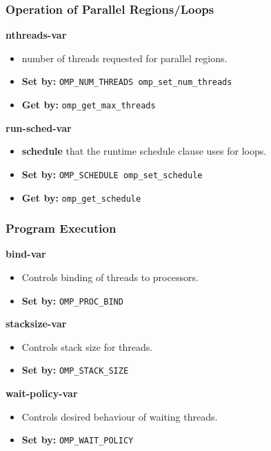 \documentclass[aspectratio=43]{beamer}
\newenvironment{changemargin}[1]{%
  \begin{list}{}{%
    \setlength{\topsep}{0pt}%
    \setlength{\leftmargin}{#1}%
    \setlength{\rightmargin}{1em}
    \setlength{\listparindent}{\parindent}%
    \setlength{\itemindent}{\parindent}%
    \setlength{\parsep}{\parskip}%
  }%
  \item[]}{\end{list}}
\begin{document}
\begin{frame}
  \frametitle{Operation of Parallel Regions/Loops}

  \begin{changemargin}{1.5cm}
  {\bf nthreads-var}
  \begin{itemize}
    \item number of threads requested for parallel regions.
    \item {\bf Set by:} {\tt OMP\_NUM\_THREADS omp\_set\_num\_threads}
    \item {\bf Get by:} {\tt omp\_get\_max\_threads}
  \end{itemize}
  \vfill
  {\bf run-sched-var}
  \begin{itemize}
    \item {\bf schedule} that the runtime schedule clause uses for loops.
    \item {\bf Set by:} {\tt OMP\_SCHEDULE omp\_set\_schedule}
    \item {\bf Get by:} {\tt omp\_get\_schedule}
  \end{itemize}
  \end{changemargin}

\end{frame}

\begin{frame}
  \frametitle{Program Execution}

  \begin{changemargin}{1.5cm}
  {\bf bind-var}
  \begin{itemize}
    \item Controls binding of threads to processors.
    \item {\bf Set by:} {\tt OMP\_PROC\_BIND}
  \end{itemize}
  \vfill
  {\bf stacksize-var}
  \begin{itemize}
    \item Controls stack size for threads.
    \item {\bf Set by:} {\tt OMP\_STACK\_SIZE}
  \end{itemize}
  \vfill
  {\bf wait-policy-var}
  \begin{itemize}
    \item Controls desired behaviour of waiting threads.
    \item {\bf Set by:} {\tt OMP\_WAIT\_POLICY}
  \end{itemize}
  \end{changemargin}

\end{frame}
\end{document}
